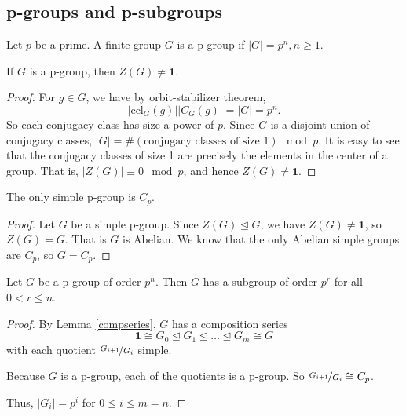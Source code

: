 \subsection{p-groups and p-subgroups}
\leavevmode
\begin{definition}
    Let \(p\) be a prime. A finite group \(G\) is a p-group if \(\left\vert G \right\vert = p^n, n\geq 1\).
\end{definition}
\begin{theorem}
    If \(G\) is a p-group, then \(Z(G) \neq \textbf{1} \).
\end{theorem}
\begin{proof}
    For \(g \in G\), we have by orbit-stabilizer theorem,
    \[\left\vert \mathrm{ccl}_G(g) \right\vert \left\vert C_G(g) \right\vert = \left\vert G \right\vert = p^n.\] 
    So each conjugacy class has size a power of \(p\). Since \(G\) is a disjoint union of conjugacy classes, \(\left\vert G \right\vert= \# (\text{conjugacy classes of size 1})\mod p\). It is easy to see that the conjugacy classes of size 1 are precisely the elements in the center of a group. That is, \(\left\vert Z(G)\right\vert \equiv 0 \mod p  \), and hence \(Z(G) \neq \textbf{1}\).
\end{proof}
\begin{corollary} The only simple p-group is \(C_p\).
\end{corollary}
\begin{proof}
    Let \(G\) be a simple p-group. Since \(Z(G) \trianglelefteq G\), we have \(Z(G) \neq \textbf{1} \), so \(Z(G) = G\). That is \(G\) is Abelian. We know that the only Abelian simple groups are \(C_p\), so \(G = C_p\).
\end{proof}
\begin{corollary}
    Let \(G\) be a p-group of order \(p^n\). Then \(G\) has a subgroup of order \(p^r\) for all \(0 < r \leq n\).
\end{corollary}
\begin{proof}
    By Lemma \eqref{compseries}, \(G\) has a composition series
    \[
        \textbf{1} \cong G_0 \trianglelefteq G_1 \trianglelefteq \ldots \trianglelefteq G_m \cong G
    \]
    with each quotient \(\nicefrac{G_{i+1}}{G_{i}}\) simple.
    
    Because \(G\) is a p-group, each of the quotients is a p-group. So \(\nicefrac{G_{i+1}}{G_i}\cong C_p\).

    Thus, \(\left\vert G_i \right\vert =p^i\) for \(0\leq i \leq m = n\).
\end{proof}
